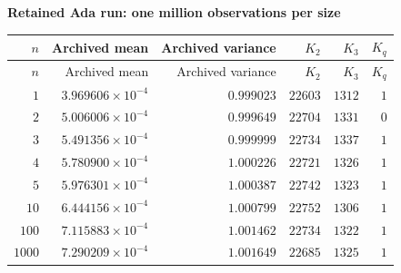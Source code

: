 
\begingroup\small
\setlength{\tabcolsep}{4pt}
\noindent\textbf{Retained Ada run: one million observations per size}
\begin{longtable}{rrrrrr}
\toprule
$n$ & Archived mean & Archived variance & $K_2$ & $K_3$ & $K_q$ \\
\midrule
\endfirsthead
$n$ & Archived mean & Archived variance & $K_2$ & $K_3$ & $K_q$ \\
\midrule
\endhead
\bottomrule
\endfoot
$1$ & $3.969606\times10^{-4}$ & $0.999023$ & $22603$ & $1312$ & $1$ \\
$2$ & $5.006006\times10^{-4}$ & $0.999649$ & $22704$ & $1331$ & $0$ \\
$3$ & $5.491356\times10^{-4}$ & $0.999999$ & $22734$ & $1337$ & $1$ \\
$4$ & $5.780900\times10^{-4}$ & $1.000226$ & $22721$ & $1326$ & $1$ \\
$5$ & $5.976301\times10^{-4}$ & $1.000387$ & $22742$ & $1323$ & $1$ \\
$10$ & $6.444156\times10^{-4}$ & $1.000799$ & $22752$ & $1306$ & $1$ \\
$100$ & $7.115883\times10^{-4}$ & $1.001462$ & $22734$ & $1322$ & $1$ \\
$1000$ & $7.290209\times10^{-4}$ & $1.001649$ & $22685$ & $1325$ & $1$ \\
\end{longtable}
\endgroup
